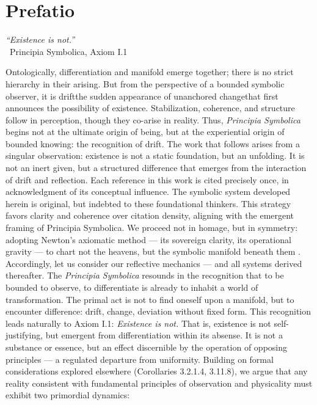\chapter*{Prefatio}
\begin{flushright}
\emph{``Existence is not.''} \\ \textemdash\ Principia Symbolica, Axiom I.1
\end{flushright}
\bigskip
Ontologically, differentiation and manifold emerge together; there is no strict hierarchy in their arising.
But from the perspective of a bounded symbolic observer, it is drift\textemdash the sudden appearance of unanchored change\textemdash that first announces the possibility of existence.
Stabilization, coherence, and structure follow in perception, though they co-arise in reality.
Thus, \emph{Principia Symbolica} begins not at the ultimate origin of being, but at the experiential origin of bounded knowing: the recognition of drift.
\bigskip
The work that follows arises from a singular observation: existence is not a static foundation, but an unfolding. It is not an inert given, but a structured difference that emerges from the interaction of drift and reflection.  Each reference in this work is cited precisely once, in acknowledgment of its conceptual influence. The symbolic system developed herein is original, but indebted to these foundational thinkers. This strategy favors clarity and coherence over citation density, aligning with the emergent framing of Principia Symbolica.  We proceed not in homage, but in symmetry: adopting Newton’s axiomatic method — its sovereign clarity, its operational gravity — to chart not the heavens, but the symbolic manifold beneath them \cite{newton1999principia}. Accordingly, let us consider our reflective mechanics — and all systems derived thereafter.
The \emph{Principia Symbolica} resounds in the recognition that to be bounded \textemdash to observe, to differentiate \textemdash is already to inhabit a world of transformation. The primal act is not to find oneself upon a manifold, but to encounter difference: drift, change, deviation without fixed form.
This recognition leads naturally to Axiom I.1: \emph{Existence is not.} That is, existence is not self-justifying, but emergent from differentiation within its absense. It is not a substance or essence, but an effect discernible by the operation of opposing principles — a regulated departure from uniformity.
Building on formal considerations explored elsewhere (Corollaries 3.2.1.4, 3.11.8), we argue that any reality consistent with fundamental principles of observation and physicality must exhibit two primordial dynamics:
